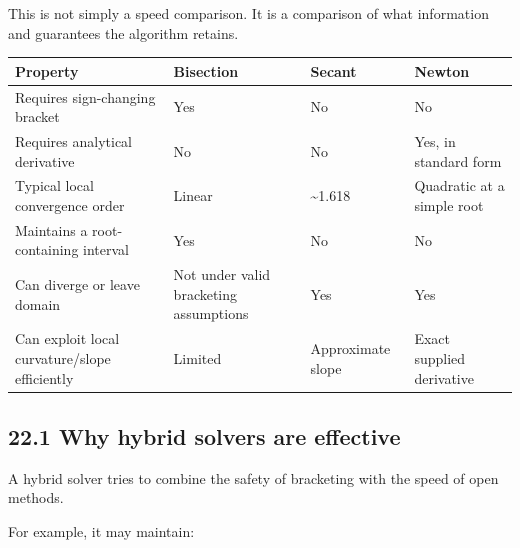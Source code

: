 This is not simply a speed comparison. It is a comparison of what information and guarantees the algorithm retains.

{\def\LTcaptype{none} %
\begin{longtable}[]{@{}
  >{\raggedright\arraybackslash}p{}
  >{\raggedright\arraybackslash}p{}
  >{\raggedright\arraybackslash}p{}
  >{\raggedright\arraybackslash}p{}@{}}
\toprule\noalign{}
\begin{minipage}[b]{\linewidth}\raggedright
Property
\end{minipage} & \begin{minipage}[b]{\linewidth}\raggedright
Bisection
\end{minipage} & \begin{minipage}[b]{\linewidth}\raggedright
Secant
\end{minipage} & \begin{minipage}[b]{\linewidth}\raggedright
Newton
\end{minipage} \\
\midrule\noalign{}
\endhead
\bottomrule\noalign{}
\endlastfoot
Requires sign-changing bracket & Yes & No & No \\
Requires analytical derivative & No & No & Yes, in standard form \\
Typical local convergence order & Linear & \textasciitilde1.618 & Quadratic at a simple root \\
Maintains a root-containing interval & Yes & No & No \\
Can diverge or leave domain & Not under valid bracketing assumptions & Yes & Yes \\
Can exploit local curvature/slope efficiently & Limited & Approximate slope & Exact supplied derivative \\
\end{longtable}
}

\subsection{22.1 Why hybrid solvers are effective}\label{02-foundations-ii-ch028-why-hybrid-solvers-are-effective}

A hybrid solver tries to combine the safety of bracketing with the speed of open methods.

For example, it may maintain:

